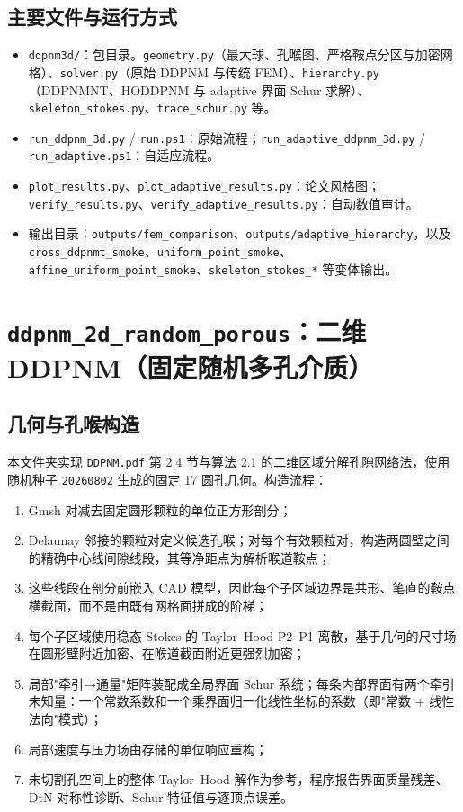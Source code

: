 \documentclass[11pt,a4paper]{ctexart}
\newcommand{\Dd}{DDPNM}
\begin{document}
\subsection{主要文件与运行方式}
\label{sec:3d-files}

\begin{itemize}[itemsep=2pt]
  \item \texttt{ddpnm3d/}：包目录。\texttt{geometry.py}（最大球、孔喉图、严格鞍点分区与加密网格）、\texttt{solver.py}（原始 \Dd{} 与传统 FEM）、\texttt{hierarchy.py}（\Dd{}NT、HODDPNM 与 adaptive 界面 Schur 求解）、\texttt{skeleton\_stokes.py}、\texttt{trace\_schur.py} 等。
  \item \texttt{run\_ddpnm\_3d.py} / \texttt{run.ps1}：原始流程；\texttt{run\_adaptive\_ddpnm\_3d.py} / \texttt{run\_adaptive.ps1}：自适应流程。
  \item \texttt{plot\_results.py}、\texttt{plot\_adaptive\_results.py}：论文风格图；\texttt{verify\_results.py}、\texttt{verify\_adaptive\_results.py}：自动数值审计。
  \item 输出目录：\texttt{outputs/fem\_comparison}、\texttt{outputs/adaptive\_hierarchy}，以及 \texttt{cross\_ddpnmt\_smoke}、\texttt{uniform\_point\_smoke}、\texttt{affine\_uniform\_point\_smoke}、\texttt{skeleton\_stokes\_*} 等变体输出。
\end{itemize}

\newpage
\section{\texttt{ddpnm\_2d\_random\_porous}：二维 \Dd{}（固定随机多孔介质）}
\label{sec:2d}

\subsection{几何与孔喉构造}
\label{sec:2d-geometry}

本文件夹实现 \texttt{DDPNM.pdf} 第 2.4 节与算法 2.1 的二维区域分解孔隙网络法，使用随机种子 \texttt{20260802} 生成的固定 17 圆孔几何。构造流程：

\begin{enumerate}[itemsep=2pt]
  \item Gmsh 对减去固定圆形颗粒的单位正方形剖分；
  \item Delaunay 邻接的颗粒对定义候选孔喉；对每个有效颗粒对，构造两圆壁之间的精确中心线间隙线段，其等净距点为解析喉道鞍点；
  \item 这些线段在剖分前嵌入 CAD 模型，因此每个子区域边界是共形、笔直的鞍点横截面，而不是由既有网格面拼成的阶梯；
  \item 每个子区域使用稳态 Stokes 的 Taylor--Hood P2--P1 离散，基于几何的尺寸场在圆形壁附近加密、在喉道截面附近更强烈加密；
  \item 局部"牵引→通量"矩阵装配成全局界面 Schur 系统；每条内部界面有两个牵引未知量：一个常数系数和一个乘界面归一化线性坐标的系数（即"常数 + 线性法向"模式）；
  \item 局部速度与压力场由存储的单位响应重构；
  \item 未切割孔空间上的整体 Taylor--Hood 解作为参考，程序报告界面质量残差、DtN 对称性诊断、Schur 特征值与逐顶点误差。
\end{enumerate}
\end{document}
